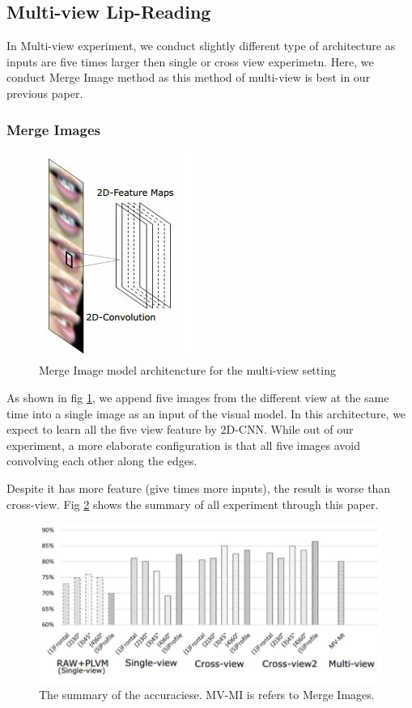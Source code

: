 \subsection{Multi-view Lip-Reading}
In Multi-view experiment, we conduct slightly different type of architecture as inputs are five times larger then single or cross view experimetn. Here, we conduct Merge Image method as this method of multi-view is best in our previous paper.

\subsubsection*{Merge Images}
\begin{figure}[h]
	\centering
	\includegraphics[width=0.4\columnwidth]{fig/mi.jpg}
	\caption{Merge Image model architencture for the multi-view setting}
	\label{fig:mi}
\end{figure}
As shown in fig \ref{fig:mi}, we append five images from the different
view at the same time into a single image as an input of the visual model. In this
architecture, we expect to learn all the five view feature by 2D-CNN. While out
of our experiment, a more elaborate configuration is that all five images avoid
convolving each other along the edges.

Despite it has more feature (give times more inputs), the result is worse than cross-view.
Fig \ref{fig:summary} shows the summary of all experiment through this paper.
\begin{figure}[h]
	\centering
	\includegraphics[width=\columnwidth]{fig/summary.jpg}
	\caption{The summary of the accuraciese. MV-MI is refers to Merge Images.}
	\label{fig:summary}
\end{figure}